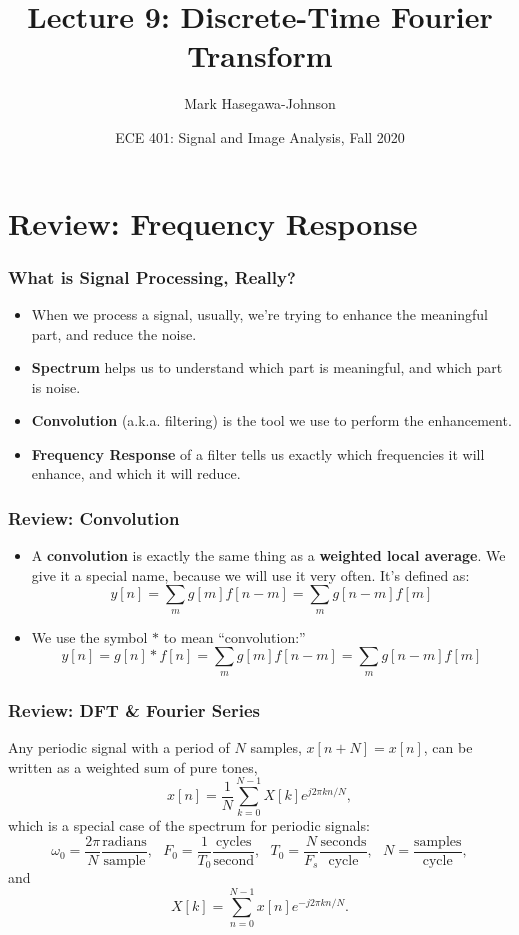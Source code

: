 \documentclass{beamer}
\title{Lecture 9: Discrete-Time Fourier Transform}
\author{Mark Hasegawa-Johnson}
\date{ECE 401: Signal and Image Analysis, Fall 2020}
\begin{document}
\begin{frame}
  \maketitle
\end{frame}

\begin{frame}
  \tableofcontents
\end{frame}

\section[Review]{Review: Frequency Response}
\setcounter{subsection}{1}

\begin{frame}
  \frametitle{What is Signal Processing, Really?}

  \begin{itemize}
  \item When we process a signal, usually, we're trying to
    enhance the meaningful part, and reduce the noise.
  \item {\bf Spectrum} helps us  to understand which part is
    meaningful, and which part is noise.
  \item {\bf Convolution} (a.k.a. filtering) is the tool we use to
    perform the enhancement.
  \item {\bf Frequency Response} of a filter tells us exactly which
    frequencies it will enhance, and which it will reduce.
  \end{itemize}
\end{frame}

\begin{frame}
  \frametitle{Review: Convolution}
  \begin{itemize}
  \item A {\bf convolution} is exactly the same thing as a {\bf weighted local average}.
    We give it a special name, because we will use it very often.  It's defined as:
    \[
    y[n] = \sum_m g[m] f[n-m] = \sum_m g[n-m] f[m]
    \]
  \item 
    We use the symbol $\ast$ to mean ``convolution:''
    \[
    y[n]=g[n]\ast f[n] = \sum_m g[m] f[n-m] = \sum_m g[n-m] f[m]
    \]
  \end{itemize}
\end{frame}

\begin{frame}
  \frametitle{Review: DFT \& Fourier Series}

  Any periodic signal with a period of $N$ samples, $x[n+N] = x[n]$,
  can be written as a weighted sum of pure tones,
  \[
  x[n] = \frac{1}{N}\sum_{k=0}^{N-1} X[k] e^{j2\pi kn/N},
  \]
  which is a special case of the spectrum for periodic signals:
  \[
  \omega_0=\frac{2\pi}{N}\frac{\mbox{radians}}{\mbox{sample}},~~~
  F_0=\frac{1}{T_0}\frac{\mbox{cycles}}{\mbox{second}},~~~
  T_0=\frac{N}{F_s}\frac{\mbox{seconds}}{\mbox{cycle}},~~~
  N = \frac{\mbox{samples}}{\mbox{cycle}},
  \]
  and
  \[
  X[k] = \sum_{n=0}^{N-1} x[n]e^{-j2\pi kn/N}.
  \]
\end{frame}
\end{document}
